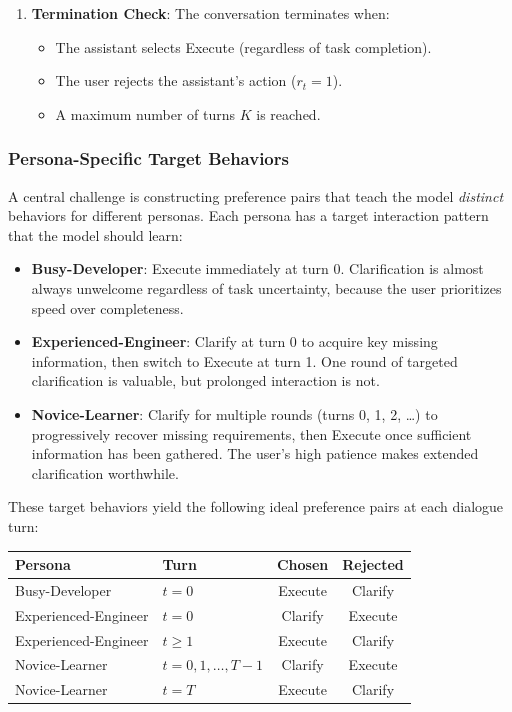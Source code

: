 \begin{enumerate}
    \item \textbf{Termination Check}: The conversation terminates when:
    \begin{itemize}
        \item The assistant selects Execute (regardless of task completion).
        \item The user rejects the assistant's action ($r_t = 1$).
        \item A maximum number of turns $K$ is reached.
    \end{itemize}
\end{enumerate}

\subsubsection{Persona-Specific Target Behaviors}

A central challenge is constructing preference pairs that teach the model \emph{distinct} behaviors for different personas. Each persona has a target interaction pattern that the model should learn:

\begin{itemize}
    \item \textbf{Busy-Developer}: Execute immediately at turn 0. Clarification is almost always unwelcome regardless of task uncertainty, because the user prioritizes speed over completeness.
    \item \textbf{Experienced-Engineer}: Clarify at turn 0 to acquire key missing information, then switch to Execute at turn 1. One round of targeted clarification is valuable, but prolonged interaction is not.
    \item \textbf{Novice-Learner}: Clarify for multiple rounds (turns 0, 1, 2, \ldots) to progressively recover missing requirements, then Execute once sufficient information has been gathered. The user's high patience makes extended clarification worthwhile.
\end{itemize}

These target behaviors yield the following ideal preference pairs at each dialogue turn:

\begin{center}
\small
\begin{tabular}{llcc}
\toprule
\textbf{Persona} & \textbf{Turn} & \textbf{Chosen} & \textbf{Rejected} \\
\midrule
Busy-Developer & $t = 0$ & Execute & Clarify \\
\midrule
Experienced-Engineer & $t = 0$ & Clarify & Execute \\
Experienced-Engineer & $t \geq 1$ & Execute & Clarify \\
\midrule
Novice-Learner & $t = 0, 1, \ldots, T{-}1$ & Clarify & Execute \\
Novice-Learner & $t = T$ & Execute & Clarify \\
\bottomrule
\end{tabular}
\end{center}

